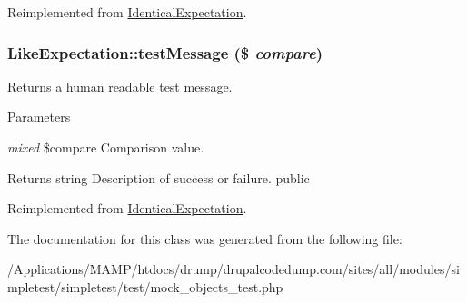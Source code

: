 Reimplemented from \hyperlink{class_identical_expectation_a6076cd232c16294ca0a7979ce11e57da}{IdenticalExpectation}.\hypertarget{class_like_expectation_a421ebb1546193d32db6461d930150052}{
\subsubsection[{testMessage}]{\setlength{\rightskip}{0pt plus 5cm}LikeExpectation::testMessage (\$ {\em compare})}}
\label{class_like_expectation_a421ebb1546193d32db6461d930150052}
Returns a human readable test message. 
\begin{DoxyParams}{Parameters}
\item[{\em mixed}]\$compare Comparison value. \end{DoxyParams}
\begin{DoxyReturn}{Returns}
string Description of success or failure.  public 
\end{DoxyReturn}


Reimplemented from \hyperlink{class_identical_expectation_a80c36b4efb3126695a69d4823ab3122b}{IdenticalExpectation}.

The documentation for this class was generated from the following file:\begin{DoxyCompactItemize}
\item 
/Applications/MAMP/htdocs/drump/drupalcodedump.com/sites/all/modules/simpletest/simpletest/test/mock\_\-objects\_\-test.php\end{DoxyCompactItemize}
